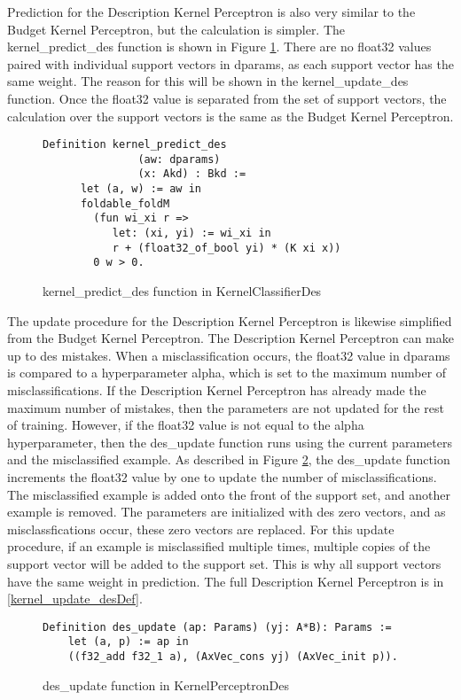 Prediction for the Description Kernel Perceptron is also very similar to the Budget Kernel Perceptron, but the calculation is simpler. The kernel\_predict\_des function is shown in Figure \ref{kernel_predict_desDef}. There are no float32 values paired with individual support vectors in dparams, as each support vector has the same weight. The reason for this will be shown in the kernel\_update\_des function. Once the float32 value is separated from the set of support vectors, the calculation over the support vectors is the same as the Budget Kernel Perceptron.

\begin{figure}
    \caption{kernel\_predict\_des function in KernelClassifierDes}
    \label{kernel_predict_desDef}
    \begin{lstlisting}
Definition kernel_predict_des
               (aw: dparams)
               (x: Akd) : Bkd :=
      let (a, w) := aw in
      foldable_foldM
        (fun wi_xi r =>
           let: (xi, yi) := wi_xi in 
           r + (float32_of_bool yi) * (K xi x))
        0 w > 0.
    \end{lstlisting}
\end{figure}

The update procedure for the Description Kernel Perceptron is likewise simplified from the Budget Kernel Perceptron. The Description Kernel Perceptron can make up to des mistakes. When a misclassification occurs, the float32 value in dparams is compared to a hyperparameter alpha, which is set to the maximum number of misclassifications. If the Description Kernel Perceptron has already made the maximum number of mistakes, then the parameters are not updated for the rest of training. However, if the float32 value is not equal to the alpha hyperparameter, then the des\_update function runs using the current parameters and the misclassified example. As described in Figure \ref{des_updateDef}, the des\_update function increments the float32 value by one to update the number of misclassifications. The misclassified example is added onto the front of the support set, and another example is removed. The parameters are initialized with des zero vectors, and as misclassfications occur, these zero vectors are replaced. For this update procedure, if an example is misclassified multiple times, multiple copies of the support vector will be added to the support set. This is why all support vectors have the same weight in prediction. The full Description Kernel Perceptron is in \ref{kernel_update_desDef}.

\begin{figure}
    \caption{des\_update function in KernelPerceptronDes}
    \label{des_updateDef}
    \begin{lstlisting}
Definition des_update (ap: Params) (yj: A*B): Params :=      
    let (a, p) := ap in
    ((f32_add f32_1 a), (AxVec_cons yj) (AxVec_init p)).
    \end{lstlisting}
\end{figure}

